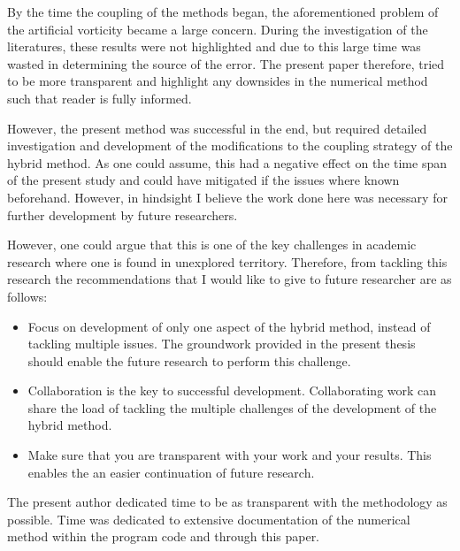 By the time the coupling of the methods began, the aforementioned problem of the artificial vorticity became a large concern. During the investigation of the literatures, these results were not highlighted and due to this large time was wasted in determining the source of the error. The present paper therefore, tried to be more transparent and highlight any downsides in the numerical method such that reader is fully informed.

However, the present method was successful in the end, but required detailed investigation and development of the modifications to the coupling strategy of the hybrid method. As one could assume, this had a negative effect on the time span of the present study and could have mitigated if the issues where known beforehand. However, in hindsight I believe the work done here was necessary for further development by future researchers.

However, one could argue that this is one of the key challenges in academic research where one is found in unexplored territory. Therefore, from tackling this research the recommendations that I would like to give to future researcher are as follows:
\begin{itemize}
\item Focus on development of only one aspect of the hybrid method, instead of tackling multiple issues. The groundwork provided in the present thesis should enable the future research to perform this challenge.
\item Collaboration is the key to successful development. Collaborating work can share the load of tackling the multiple challenges of the development of the hybrid method. %
\item Make sure that you are transparent with your work and your results. This enables the an easier continuation of future research.
\end{itemize}

The present author dedicated time to be as transparent with the methodology as possible. Time was dedicated to extensive documentation of the numerical method within the program code and through this paper.



